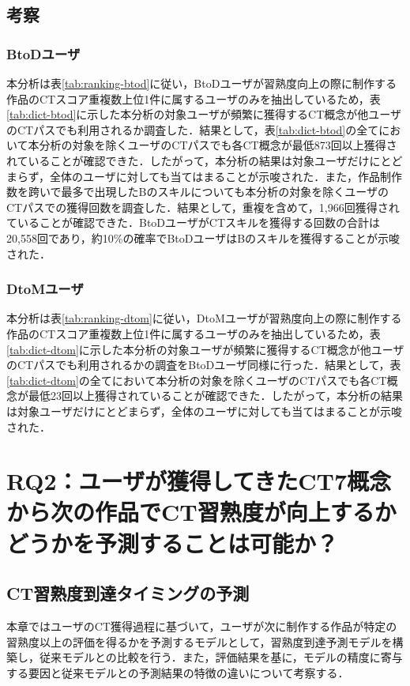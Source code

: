 \documentclass[submit,ses,noauthor]{ipsj}
\begin{document}
\section{考察}

\subsection*{BtoDユーザ}

本分析は表\ref{tab:ranking-btod}に従い，BtoDユーザが習熟度向上の際に制作する作品のCTスコア重複数上位1件に属するユーザのみを抽出しているため，表\ref{tab:dict-btod}に示した本分析の対象ユーザが頻繁に獲得するCT概念が他ユーザのCTパスでも利用されるか調査した．結果として，表\ref{tab:dict-btod}の全てにおいて本分析の対象を除くユーザのCTパスでも各CT概念が最低873回以上獲得されていることが確認できた．したがって，本分析の結果は対象ユーザだけにとどまらず，全体のユーザに対しても当てはまることが示唆された．また，作品制作数を跨いで最多で出現したBのスキルについても本分析の対象を除くユーザのCTパスでの獲得回数を調査した．結果として，重複を含めて，1,966回獲得されていることが確認できた．BtoDユーザがCTスキルを獲得する回数の合計は20,558回であり，約10\%の確率でBtoDユーザはBのスキルを獲得することが示唆された．

\subsection*{DtoMユーザ}

本分析は表\ref{tab:ranking-dtom}に従い，DtoMユーザが習熟度向上の際に制作する作品のCTスコア重複数上位1件に属するユーザのみを抽出しているため，表\ref{tab:dict-dtom}に示した本分析の対象ユーザが頻繁に獲得するCT概念が他ユーザのCTパスでも利用されるかの調査をBtoDユーザ同様に行った．結果として，表\ref{tab:dict-dtom}の全てにおいて本分析の対象を除くユーザのCTパスでも各CT概念が最低23回以上獲得されていることが確認できた．したがって，本分析の結果は対象ユーザだけにとどまらず，全体のユーザに対しても当てはまることが示唆された．

\chapter{RQ2：ユーザが獲得してきたCT7概念から次の作品でCT習熟度が向上するかどうかを予測することは可能か？}
\section{CT習熟度到達タイミングの予測}
本章ではユーザのCT獲得過程に基づいて，ユーザが次に制作する作品が特定の習熟度以上の評価を得るかを予測するモデルとして，習熟度到達予測モデルを構築し，従来モデルとの比較を行う．また，評価結果を基に，モデルの精度に寄与する要因と従来モデルとの予測結果の特徴の違いについて考察する．
\end{document}
